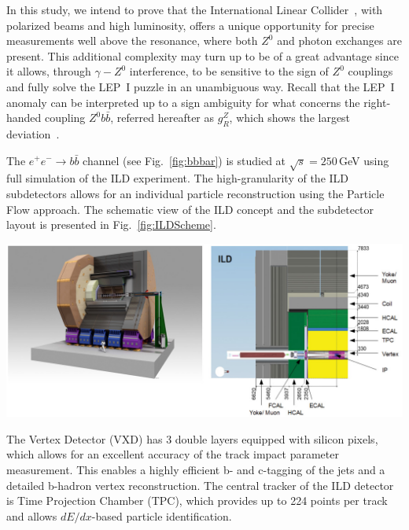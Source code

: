 In this study, we intend to prove that the International Linear Collider~\cite{bib:ILC}, with polarized beams and 
high luminosity, offers a unique opportunity for precise measurements well above the resonance, where both $Z^0$ and photon exchanges are present. 
This additional complexity may turn up to be of a great advantage since it allows, through $\gamma - Z^0$ interference, to be sensitive to the sign of $Z^0$ couplings and fully solve the LEP~I puzzle in an unambiguous way. 
Recall that the LEP~I anomaly can be interpreted up to a sign ambiguity for what concerns the right‐handed coupling $Z^0 b\bar{b}$, referred 
hereafter as $g_R^Z$, which shows the largest deviation~\cite{bib:RSTOP}.  


The $e^+ e^-\to b\bar{b}$ channel (see Fig.~\ref{fig:bbbar}) is studied at $\sqrt{s}=250$\,GeV using full simulation of the ILD experiment.
The high-granularity of the ILD subdetectors allows for an individual particle reconstruction using the Particle Flow approach.
The schematic view of the ILD concept and the subdetector layout is presented in Fig.~\ref{fig:ILDScheme}.
\begin{center}\vspace{1cm}
	\centering

	\includegraphics[width=0.8\linewidth]{figures/ild.png}
		\label{fig:ILDScheme}
\end{center}\vspace{1cm}
The Vertex Detector (VXD) has 3 double layers equipped with silicon pixels, which allows for an excellent accuracy of the track impact parameter measurement.  
This enables a highly efficient b- and c-tagging of the jets and a detailed b-hadron vertex reconstruction. 
The central tracker of the ILD detector is Time Projection Chamber (TPC), which provides up to 224 points per track and allows $dE/dx$-based particle identification.


